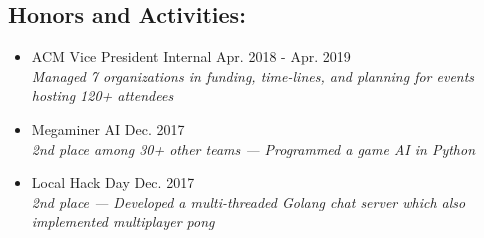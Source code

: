 \documentclass[9pt,oneside]{memoir}
\begin{document}
\vspace*{-11px}
\subsection*{Honors and Activities:}

\begin{itemize}
      \item[] ACM Vice President Internal
            \hfill Apr. 2018 - Apr. 2019\\
            \textit{Managed 7 organizations in funding, time-lines, and planning for events hosting 120+ attendees}
      \item[] Megaminer AI
            \hfill Dec. 2017\\
            \textit{2nd place among 30+ other teams --- Programmed a game AI in Python}
      \item[] Local Hack Day
            \hfill Dec. 2017\\
            \textit{2nd place --- Developed a multi-threaded Golang chat server which also implemented multiplayer pong}
\end{itemize}
\end{document}
